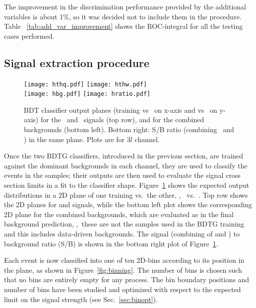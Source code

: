 The improvement in the discrimination performance provided by the additional variables is about 1\%, so it was decided not to include them in the procedure. Table ~\ref{tab:add_var_improvement} shows the ROC-integral for all the testing cases performed.

\subsection{Signal extraction procedure}

\begin{figure} [!h]
 \centering
 \texttt{[image: hthq.pdf]}
 \texttt{[image: hthw.pdf]}\\
 \texttt{[image: hbg.pdf]}
 \texttt{[image: hratio.pdf]}
\caption[2D BDT classifier output planes]{BDT classifier output planes (training vs \ttbar\ on x-axis and vs \ttV\ on y-axis) for the \tHq\ and \tHW\ signals (top row), and for the combined backgrounds (bottom left). Bottom right: S/B ratio (combining \tHq\ and \tHW) in the same plane. Plots are for $3l$ channel.}
\label{fig:mva12}
\end{figure}

Once the two BDTG classifiers, introduced in the previous section, are trained against the dominant backgrounds in each channel, they are used to classify the events in the samples; their outputs are then used to evaluate the signal cross section limits in a fit to the classifier shape. Figure~\ref{fig:mva12} shows the expected output distributions in a 2D plane of one training vs.\ the other, \ie, \ttV\ vs.\ \ttbar. Top row shows the 2D planes for \tHq and \tHW signals, while the bottom left plot shows the corresponding 2D plane for the combined backgrounds, which are evaluated as in the final background prediction, \ie,\ these are not the samples used in the BDTG training and this includes data-driven backgrounds. The signal (combining of \tHq and \tHW) to background ratio (S/B) is shown in the bottom right plot of Figure~\ref{fig:mva12}.      

Each event is now classified into one of ten 2D-bins according to its position in the plane, as shown in Figure~\ref{fig:binning}. The number of bins is chosen such that no bins are entirely empty for any process. The bin boundary positions and number of bins have been studied and optimized with respect to the expected limit on the signal strength (see Sec.~\ref{sec:binopt}).

